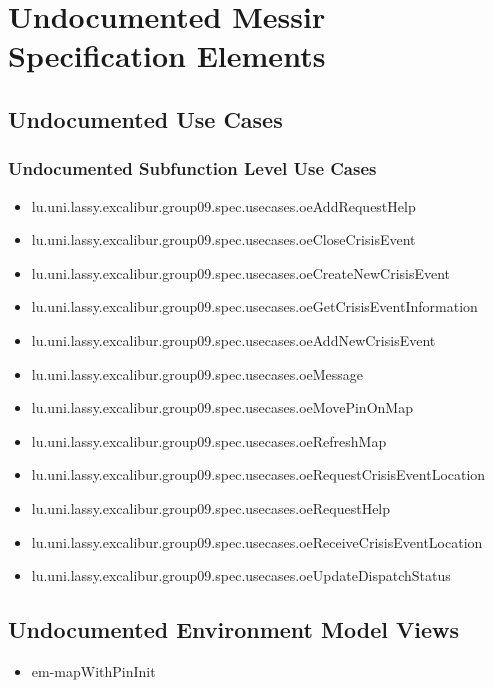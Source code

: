 	
\chapter{Undocumented Messir Specification Elements}


\section[Undocumented Use Cases]{Undocumented Use Cases}



\subsection[Undocumented Use Cases - Subfunction Level]{Undocumented Subfunction Level Use Cases}
\begin{itemize}
\item lu.uni.lassy.excalibur.group09.spec.usecases.oeAddRequestHelp 
\item lu.uni.lassy.excalibur.group09.spec.usecases.oeCloseCrisisEvent 
\item lu.uni.lassy.excalibur.group09.spec.usecases.oeCreateNewCrisisEvent 
\item lu.uni.lassy.excalibur.group09.spec.usecases.oeGetCrisisEventInformation 
\item lu.uni.lassy.excalibur.group09.spec.usecases.oeAddNewCrisisEvent 
\item lu.uni.lassy.excalibur.group09.spec.usecases.oeMessage 
\item lu.uni.lassy.excalibur.group09.spec.usecases.oeMovePinOnMap 
\item lu.uni.lassy.excalibur.group09.spec.usecases.oeRefreshMap 
\item lu.uni.lassy.excalibur.group09.spec.usecases.oeRequestCrisisEventLocation 
\item lu.uni.lassy.excalibur.group09.spec.usecases.oeRequestHelp 
\item lu.uni.lassy.excalibur.group09.spec.usecases.oeReceiveCrisisEventLocation 
\item lu.uni.lassy.excalibur.group09.spec.usecases.oeUpdateDispatchStatus 
\end{itemize}









\section[Undocumented Environment Model Views]{Undocumented Environment Model Views}
\begin{itemize}
\item em-mapWithPinInit 
\end{itemize}





